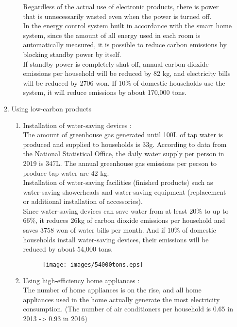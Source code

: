 \documentclass[11pt, conference]{IEEEtran}
\begin{document}
\begin{enumerate}[label=\arabic*]
\begin{enumerate}[label=\alph*]
\begin{enumerate}[label=\roman]
            Regardless of the actual use of electronic products, there is power that is unnecessarily wasted even when the power is turned off.\\
            In the energy control system built in accordance with the smart home system, since the amount of all energy used in each room is automatically measured, it is possible to reduce carbon emissions by blocking standby power by itself.\\
            If standby power is completely shut off, annual carbon dioxide emissions per household will be reduced by 82 kg, and electricity bills will be reduced by 2706 won. If 10\% of domestic households use the system, it will reduce emissions by about 170,000 tons.
        \end{enumerate}
        \item Using low-carbon products
        \begin{enumerate}[label=\roman*]
            \item Installation of water-saving devices : \\
            The amount of greenhouse gas generated until 100L of tap water is produced and supplied to households is 33g. According to data from the National Statistical Office, the daily water supply per person in 2019 is 347L. The annual greenhouse gas emissions per person to produce tap water are 42 kg.\\
            Installation of water-saving facilities (finished products) such as water-saving showerheads and water-saving equipment (replacement or additional installation of accessories).\\
            Since water-saving devices can save water from at least 20\% to up to 66\%, it reduces 26kg of carbon dioxide emissions per household and saves 3758 won of water bills per month. And if 10\% of domestic households install water-saving devices, their emissions will be reduced by about 54,000 tons.
            \begin{figure}[H]
                \centering
                \texttt{[image: images/54000tons.eps]}
            \end{figure}
            \item Using high-efficiency home appliances : \\
            The number of home appliances is on the rise, and all home appliances used in the home actually generate the most electricity consumption. (The number of air conditioners per household is 0.65 in 2013 -> 0.93 in 2016)\\

\end{enumerate}
\end{enumerate}
\end{enumerate}
\end{document}
